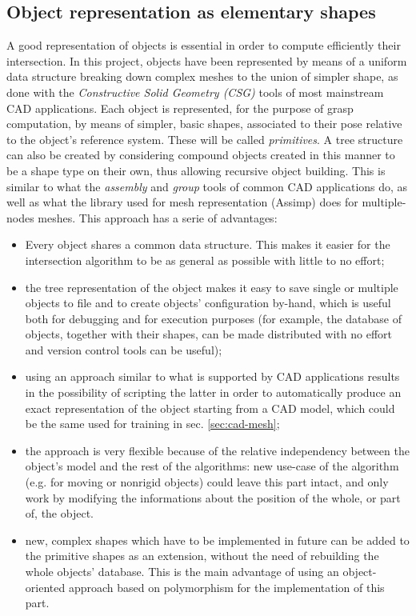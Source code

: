\subsection{Object representation as elementary shapes} \label{sec:shapes}
A good representation of objects is essential in order to compute efficiently
their intersection. In this project, objects have been represented by means of a
uniform data structure breaking down complex meshes to the union of simpler
shape, as done with the \emph{Constructive Solid Geometry (\emph{CSG})} tools of
most mainstream CAD applications. Each object is represented, for the purpose of
grasp computation, by means of simpler, basic shapes, associated to their pose
relative to the object's reference system. These will be called
\emph{primitives}. A tree structure can also be created
by considering compound objects created in this manner to be a shape type on
their own, thus allowing recursive object building. This is similar to what the
\emph{assembly} and \emph{group} tools of common CAD applications do, as well
as what the library used for mesh representation (Assimp) does for
multiple-nodes meshes. This approach has a serie of advantages:
\begin{itemize}
  \item{Every object shares a common data structure. This makes it easier for
      the intersection algorithm to be as general as possible with little to no
    effort;}
  \item{the tree representation of the object makes it easy to save single or
      multiple objects to file and to create objects' configuration by-hand,
      which is useful both for debugging and for execution purposes (for
      example, the database of objects, together with their shapes, can be made
    distributed with no effort and version control tools can be useful);}
  \item{using an approach similar to what is supported by CAD
      applications results in the possibility of scripting the latter in order
      to automatically produce an exact representation of the object starting
      from a CAD model, which could be the same used for training in sec.
    \ref{sec:cad-mesh};}
  \item{the approach is very flexible because of the relative independency
      between the object's model and the rest of the algorithms: new use-case of
      the algorithm (e.g. for moving or nonrigid objects) could leave this part intact, and
      only work by modifying the informations about the position of the whole,
    or part of, the object.}
  \item{new, complex shapes which have to be implemented in future can be added
      to the primitive shapes as an extension, without the need of rebuilding
      the whole objects' database. This is the main advantage of using an
      object-oriented approach based on polymorphism for the implementation of this
    part.}
\end{itemize}

